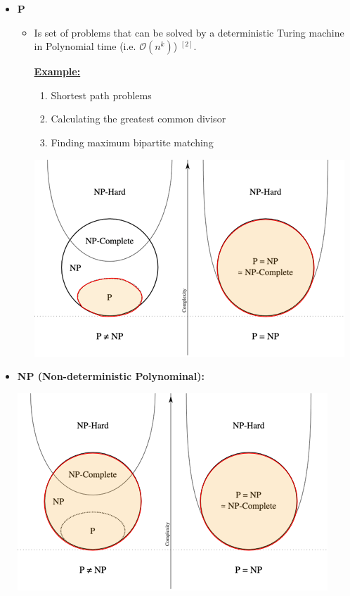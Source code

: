 \documentclass[12pt]{article}
\begin{document}
\begin{enumerate}[1.]
\begin{itemize}
        \item \textbf{P}

        \begin{itemize}
            \item Is set of problems that can be solved by a deterministic Turing machine in Polynomial time (i.e. $\mathcal{O}(n^k)$) $^{[2]}$.

            \bigskip

            \underline{\textbf{Example:}}

            \bigskip

            \begin{enumerate}[1)]
                \item Shortest path problems
                \item Calculating the greatest common divisor
                \item Finding maximum bipartite matching
            \end{enumerate}

            \bigskip

            \begin{center}
            \includegraphics[width=0.7\linewidth]{images/worksheet_7_solution_1.png}
            \end{center}
        \end{itemize}

        \bigskip

        \item \textbf{NP (Non-deterministic Polynominal):}

        \begin{center}
        \includegraphics[width=0.7\linewidth]{images/worksheet_7_solution_2.png}
        \end{center}


\end{itemize}
\end{enumerate}
\end{document}
